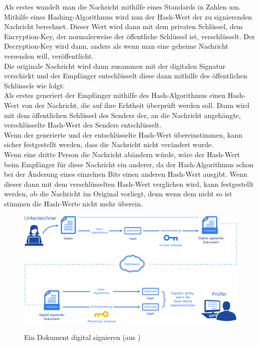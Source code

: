 \documentclass[12pt,a4paper]{scrartcl}
\begin{document}
Als erstes wandelt man die Nachricht mithilfe eines Standards in Zahlen um. Mithilfe eines Hashing-Algorithmus wird nun der Hash-Wert der zu signierenden Nachricht berechnet. Dieser Wert wird dann mit dem privaten Schlüssel, dem Encryption-Key, der normalerweise der öffentliche Schlüssel ist, verschlüsselt. %
	Der Decryption-Key wird dann, anders als wenn man eine geheime Nachricht versenden will, veröffentlicht. \cite[S.15f]{Beutelspacher2015-jl}\\
	Die originale Nachricht wird dann zusammen mit der digitalen Signatur verschickt und der Empfänger entschlüsselt diese dann mithilfe des öffentlichen Schlüssels wie folgt:\\
	Als erstes generiert der Empfänger mithilfe des Hash-Algorithmus einen Hash-Wert von der Nachricht, die auf ihre Echtheit überprüft werden soll. Dann wird mit dem öffentlichen Schlüssel des Senders der, an die Nachricht angehängte, verschlüsselte Hash-Wert des Senders entschlüsselt. \\
Wenn der generierte und der entschlüsselte Hash-Wert übereinstimmen, kann sicher festgestellt werden, dass die Nachricht nicht verändert wurde. \\
Wenn eine dritte Person die Nachricht abändern würde, wäre der Hash-Wert beim Empfänger für diese Nachricht ein anderer, da der Hash-Algorithmus schon bei der Änderung eines einzelnen Bits einen anderen Hash-Wert ausgibt. Wenn dieser dann mit dem verschlüsselten Hash-Wert verglichen wird, kann festgestellt werden, ob die Nachricht im Original vorliegt, denn wenn dem nicht so ist stimmen die Hash-Werte nicht mehr überein. \cite[S.15f]{Beutelspacher2015-jl}\\



\begin{figure}
\includegraphics[scale=0.45]{Dokument_digitale_Signatur} \\
\caption{Ein Dokument digital signieren (aus \cite{digitalsignature})}
\label{fig:figure3}
\end{figure}
\end{document}
